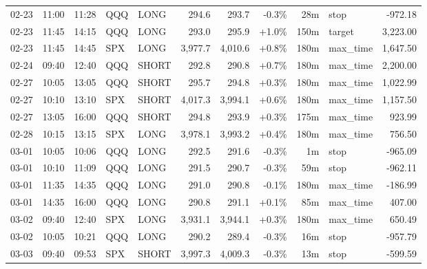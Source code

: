 \documentclass[11pt,a4paper,twoside]{article}
\begin{document}
\begin{center}
\begin{longtable}{>{\color{txtmain}}l l l l l r r r r >{\color{txtmain}}l r}
02-23 & 11:00 & 11:28 & QQQ & LONG & 294.6 & 293.7 & \textcolor{lossred}{-0.3\%} & 28m & stop & \textcolor{lossred}{-972.18} \\
02-23 & 11:45 & 14:15 & QQQ & LONG & 293.0 & 295.9 & \textcolor{wingreen}{+1.0\%} & 150m & target & \textcolor{wingreen}{3,223.00} \\
02-23 & 11:45 & 14:45 & SPX & LONG & 3,977.7 & 4,010.6 & \textcolor{wingreen}{+0.8\%} & 180m & max\_time & \textcolor{wingreen}{1,647.50} \\
02-24 & 09:40 & 12:40 & QQQ & SHORT & 292.8 & 290.8 & \textcolor{wingreen}{+0.7\%} & 180m & max\_time & \textcolor{wingreen}{2,200.00} \\
02-27 & 10:05 & 13:05 & QQQ & SHORT & 295.7 & 294.8 & \textcolor{wingreen}{+0.3\%} & 180m & max\_time & \textcolor{wingreen}{1,022.99} \\
02-27 & 10:10 & 13:10 & SPX & SHORT & 4,017.3 & 3,994.1 & \textcolor{wingreen}{+0.6\%} & 180m & max\_time & \textcolor{wingreen}{1,157.50} \\
02-27 & 13:05 & 16:00 & QQQ & SHORT & 294.8 & 293.9 & \textcolor{wingreen}{+0.3\%} & 175m & max\_time & \textcolor{wingreen}{923.99} \\
02-28 & 10:15 & 13:15 & SPX & LONG & 3,978.1 & 3,993.2 & \textcolor{wingreen}{+0.4\%} & 180m & max\_time & \textcolor{wingreen}{756.50} \\
03-01 & 10:05 & 10:06 & QQQ & LONG & 292.5 & 291.6 & \textcolor{lossred}{-0.3\%} & 1m & stop & \textcolor{lossred}{-965.09} \\
03-01 & 10:10 & 11:09 & QQQ & LONG & 291.5 & 290.7 & \textcolor{lossred}{-0.3\%} & 59m & stop & \textcolor{lossred}{-962.11} \\
03-01 & 11:35 & 14:35 & QQQ & LONG & 291.0 & 290.8 & \textcolor{lossred}{-0.1\%} & 180m & max\_time & \textcolor{lossred}{-186.99} \\
03-01 & 14:35 & 16:00 & QQQ & LONG & 290.8 & 291.1 & \textcolor{wingreen}{+0.1\%} & 85m & max\_time & \textcolor{wingreen}{407.00} \\
03-02 & 09:40 & 12:40 & SPX & LONG & 3,931.1 & 3,944.1 & \textcolor{wingreen}{+0.3\%} & 180m & max\_time & \textcolor{wingreen}{650.49} \\
03-02 & 10:05 & 10:21 & QQQ & LONG & 290.2 & 289.4 & \textcolor{lossred}{-0.3\%} & 16m & stop & \textcolor{lossred}{-957.79} \\
03-03 & 09:40 & 09:53 & SPX & SHORT & 3,997.3 & 4,009.3 & \textcolor{lossred}{-0.3\%} & 13m & stop & \textcolor{lossred}{-599.59} \\

\end{longtable}
\end{center}
\end{document}
